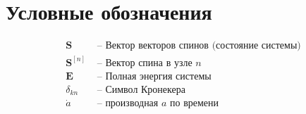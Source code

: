 \newcommand*{\heff}{\ensuremath{\mathcal{H}}}
\newcommand*{\Sn}{\ensuremath{\mathbf{S}^{[n]}}}
\chapter*{Условные обозначения}
\begin{align}
    \mathbf{S} & \text{ -- Вектор векторов спинов (состояние системы)}\\
    \Sn & \text{ -- Вектор спина в узле } n\\
    \mathbf{E} & \text{ -- Полная энергия системы}\\
    \delta_{kn} & \text{ -- Символ Кронекера}\\
    \dot a & \text{ -- производная $a$ по времени}
\end{align}

